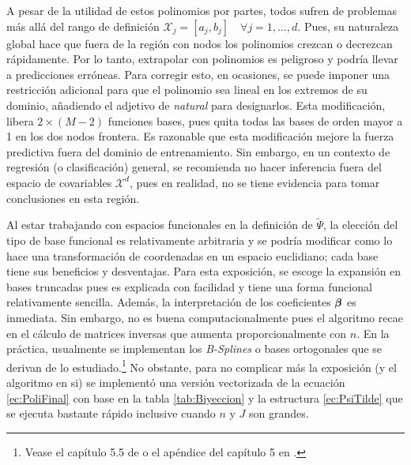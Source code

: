 \documentclass[../Main/Main.tex]{subfiles}
\begin{document}
A pesar de la utilidad de estos polinomios por partes, todos sufren de problemas más allá del rango de definición $\mathcal{X}_j = [a_j,b_j] \quad \forall j = 1,\ldots,d$. Pues, su naturaleza global hace que fuera de la región con nodos los polinomios crezcan o decrezcan rápidamente. Por lo tanto, extrapolar con polinomios es peligroso y podría llevar a predicciones erróneas. Para corregir esto, en ocasiones, se puede imponer una restricción adicional para que el polinomio sea lineal en los extremos de su dominio, añadiendo el adjetivo de \textit{natural} para designarlos. Esta modificación, libera $2\times(M-2)$ funciones bases, pues quita todas las bases de orden mayor a 1 en los dos nodos frontera. Es razonable que esta modificación mejore la fuerza predictiva fuera del dominio de entrenamiento. Sin embargo, en un contexto de regresión (o clasificación) general, se recomienda no hacer inferencia fuera del espacio de covariables $\mathcal{X}^d$, pues en realidad, no se tiene evidencia para tomar conclusiones en esta región.


Al estar trabajando con espacios funcionales en la definición de $\widetilde{\Psi}$, la elección del tipo de base funcional es relativamente arbitraria y se podría modificar como lo hace una transformación de coordenadas en un espacio euclidiano; cada base tiene sus beneficios y desventajas. Para esta exposición, se escoge la expansión en bases truncadas pues es explicada con facilidad y tiene una forma funcional relativamente sencilla. Además, la interpretación de los coeficientes $\bm{\beta}$ es inmediata. Sin embargo, no es buena computacionalmente pues el algoritmo recae en el cálculo de matrices inversas que aumenta proporcionalmente con $n$. En la práctica, usualmente se implementan los \emph{B-Splines} o bases ortogonales que se derivan de lo estudiado.\footnote{Vease el capítulo 5.5 de \citet{wasserman2007all} o el apéndice del capítulo 5 en \citet{hastie2008elements}.} No obstante, para no complicar más la exposición (y el algoritmo en si) se implementó una versión vectorizada de la ecuación \eqref{ec:PoliFinal} con base en la tabla \ref{tab:Biyeccion} y la estructura \eqref{ec:PsiTilde} que se ejecuta bastante rápido inclusive cuando $n$ y $J$ son grandes.
\end{document}
